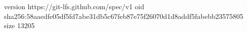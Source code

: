 version https://git-lfs.github.com/spec/v1
oid sha256:58aaedfe05df5fd7abe31db5c67feb87e75f26070d1d8addf5fabebb23575805
size 13205
